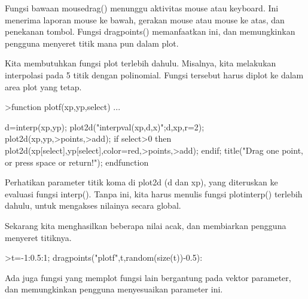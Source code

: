 \documentclass{article}
\begin{document}
\begin{eulernotebook}
\begin{eulercomment}
\begin{eulercomment}
\begin{eulercomment}
\begin{eulercomment}
\begin{eulercomment}
Fungsi bawaan mousedrag() menunggu aktivitas mouse atau keyboard. Ini
menerima laporan mouse ke bawah, gerakan mouse atau mouse ke atas, dan
penekanan tombol. Fungsi dragpoints() memanfaatkan ini, dan
memungkinkan pengguna menyeret titik mana pun dalam plot.

Kita membutuhkan fungsi plot terlebih dahulu. Misalnya, kita melakukan
interpolasi pada 5 titik dengan polinomial. Fungsi tersebut harus
diplot ke dalam area plot yang tetap.
\end{eulercomment}
\begin{eulerprompt}
>function plotf(xp,yp,select) ...
\end{eulerprompt}
\begin{eulerudf}
    d=interp(xp,yp);
    plot2d("interpval(xp,d,x)";d,xp,r=2);
    plot2d(xp,yp,>points,>add);
    if select>0 then
      plot2d(xp[select],yp[select],color=red,>points,>add);
    endif;
    title("Drag one point, or press space or return!");
  endfunction
\end{eulerudf}
\begin{eulercomment}
Perhatikan parameter titik koma di plot2d (d dan xp), yang diteruskan
ke evaluasi fungsi interp(). Tanpa ini, kita harus menulis fungsi
plotinterp() terlebih dahulu, untuk mengakses nilainya secara global.

Sekarang kita menghasilkan beberapa nilai acak, dan membiarkan
pengguna menyeret titiknya.
\end{eulercomment}
\begin{eulerprompt}
>t=-1:0.5:1; dragpoints("plotf",t,random(size(t))-0.5):
\end{eulerprompt}
\begin{eulercomment}
Ada juga fungsi yang memplot fungsi lain bergantung pada vektor
parameter, dan memungkinkan pengguna menyesuaikan parameter ini.


\end{eulercomment}
\end{eulercomment}
\end{eulercomment}
\end{eulercomment}
\end{eulercomment}
\end{eulernotebook}
\end{document}
